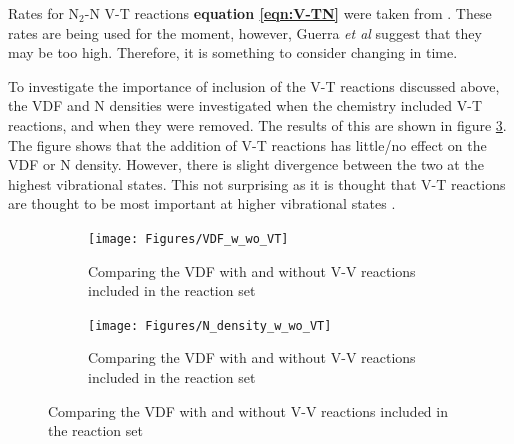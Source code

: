 \documentclass[11pt, oneside]{article}   	%
\begin{document}
Rates for N$_2$-N V-T reactions \textbf{equation \ref{eqn:V-TN}} were taken from \cite{Guerra1995non}.
These rates are being used for the moment, however, Guerra \textit{et al} \cite{Guerra2004kinetic} suggest that they may be too high.
Therefore, it is something to consider changing in time.

%


To investigate the importance of inclusion of the V-T reactions discussed above, the VDF and N densities were investigated when the chemistry included V-T reactions, and when they were removed.
The results of this are shown in figure \ref{fig:VT_vs_no_VT}.
The figure shows that the addition of V-T reactions has little/no effect on the VDF or N density.
However, there is slight divergence between the two at the highest vibrational states.
This not surprising as it is thought that V-T reactions are thought to be most important at higher vibrational states \cite{Guerra2004kinetic}.

\begin{figure}
\begin{subfigure}{0.5\textwidth}
\begin{center}
\texttt{[image: Figures/VDF\_w\_wo\_VT]}
\caption{Comparing the VDF with and without V-V reactions included in the reaction set}
\label{fig:VDFComp}
\end{center}
\end{subfigure}
\begin{subfigure}{0.5\textwidth}
\begin{center}
\texttt{[image: Figures/N\_density\_w\_wo\_VT]}
\caption{Comparing the VDF with and without V-V reactions included in the reaction set}
\label{fig:NComp}
\end{center}
\end{subfigure}
\label{fig:VT_vs_no_VT}
\end{figure}
\end{document}
